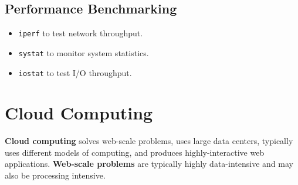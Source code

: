 \documentclass[a4paper,11pt]{article}
\begin{document}
\subsection{Performance Benchmarking}
\begin{itemize}
    \item   \verb|iperf| to test network throughput.
    \item   \verb|systat| to monitor system statistics.
    \item   \verb|iostat| to test I/O throughput.
\end{itemize}

\section{Cloud Computing}
\textbf{Cloud computing} solves web-scale problems, uses large data centers, typically uses different models of computing, and produces highly-interactive web applications.
\textbf{Web-scale problems} are typically highly data-intensive and may also be processing intensive.
\end{document}

